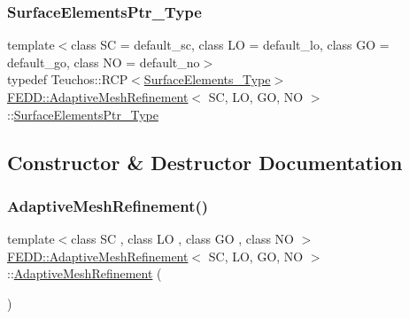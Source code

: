 \mbox{\label{classFEDD_1_1AdaptiveMeshRefinement_aabda3ef3658f8847265104c6cf9a3877}} 
\subsubsection{\texorpdfstring{Surface\+Elements\+Ptr\+\_\+\+Type}{SurfaceElementsPtr\_Type}}
{\footnotesize\ttfamily template$<$class SC  = default\+\_\+sc, class LO  = default\+\_\+lo, class GO  = default\+\_\+go, class NO  = default\+\_\+no$>$ \\
typedef Teuchos\+::\+R\+CP$<$\hyperlink{classFEDD_1_1AdaptiveMeshRefinement_afa6eaf74293132701460f9107ce0c070}{Surface\+Elements\+\_\+\+Type}$>$ \hyperlink{classFEDD_1_1AdaptiveMeshRefinement}{F\+E\+D\+D\+::\+Adaptive\+Mesh\+Refinement}$<$ SC, LO, GO, NO $>$\+::\hyperlink{classFEDD_1_1AdaptiveMeshRefinement_aabda3ef3658f8847265104c6cf9a3877}{Surface\+Elements\+Ptr\+\_\+\+Type}}



\subsection{Constructor \& Destructor Documentation}
\mbox{\label{classFEDD_1_1AdaptiveMeshRefinement_a259e41c282b1db70f233ac94854ba8bd}} 
\subsubsection{\texorpdfstring{Adaptive\+Mesh\+Refinement()}{AdaptiveMeshRefinement()}\hspace{0.1cm}{\footnotesize\ttfamily [1/4]}}
{\footnotesize\ttfamily template$<$class SC , class LO , class GO , class NO $>$ \\
\hyperlink{classFEDD_1_1AdaptiveMeshRefinement}{F\+E\+D\+D\+::\+Adaptive\+Mesh\+Refinement}$<$ SC, LO, GO, NO $>$\+::\hyperlink{classFEDD_1_1AdaptiveMeshRefinement}{Adaptive\+Mesh\+Refinement} (\begin{DoxyParamCaption}{ }\end{DoxyParamCaption})}


